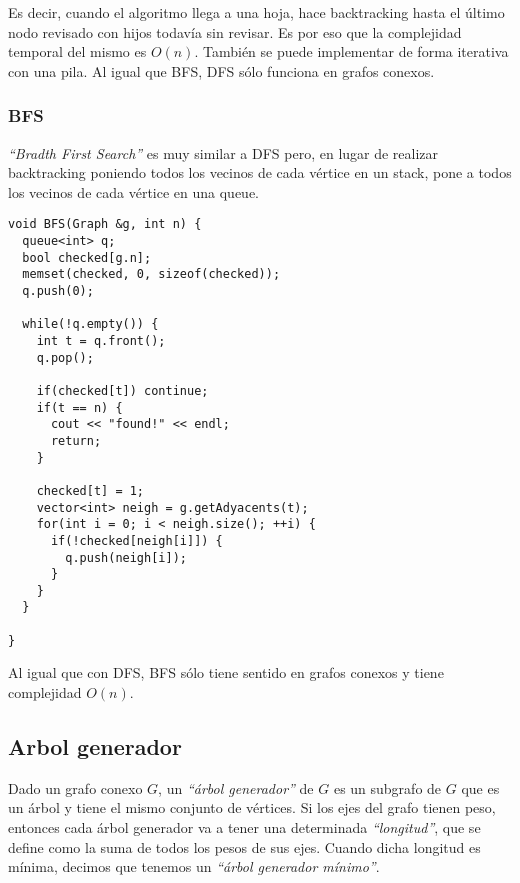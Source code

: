 Es decir, cuando el algoritmo llega a una hoja, hace backtracking hasta el \'ultimo nodo revisado con hijos todav\'ia sin revisar. Es por eso que la complejidad temporal del mismo es $O(n)$. Tambi\'en se puede implementar de forma iterativa con una pila. Al igual que BFS, DFS s\'olo funciona en grafos conexos.

\newpage
\subsubsection{BFS}

\emph{``Bradth First Search''} es muy similar a DFS pero, en lugar de realizar backtracking poniendo todos los vecinos de cada v\'ertice en un stack, pone a todos los vecinos de cada v\'ertice en una queue.
\vspace{8px}

\begin{center}
\begin{minipage}{0.78\textwidth}
\begin{lstlisting}[frame=lrtb]
void BFS(Graph &g, int n) {
  queue<int> q;
  bool checked[g.n];
  memset(checked, 0, sizeof(checked));
  q.push(0);

  while(!q.empty()) {
    int t = q.front();
    q.pop();

    if(checked[t]) continue;
    if(t == n) {
      cout << "found!" << endl;
      return;
    }

    checked[t] = 1;
    vector<int> neigh = g.getAdyacents(t); 
    for(int i = 0; i < neigh.size(); ++i) {
      if(!checked[neigh[i]]) {
        q.push(neigh[i]);
      }
    }
  }

}
\end{lstlisting}
\end{minipage}
\end{center}

Al igual que con DFS, BFS s\'olo tiene sentido en grafos conexos y tiene complejidad $O(n)$.

\newpage
\subsection{Arbol generador}

Dado un grafo conexo $G$, un \emph{``\'arbol generador''} de $G$ es un subgrafo de $G$ que es un \'arbol y tiene el mismo conjunto de v\'ertices. Si los ejes del grafo tienen peso, entonces cada \'arbol generador va a tener una determinada \emph{``longitud''}, que se define como la suma de todos los pesos de sus ejes. Cuando dicha longitud es m\'inima, decimos que tenemos un \emph{``\'arbol generador m\'inimo''}.

